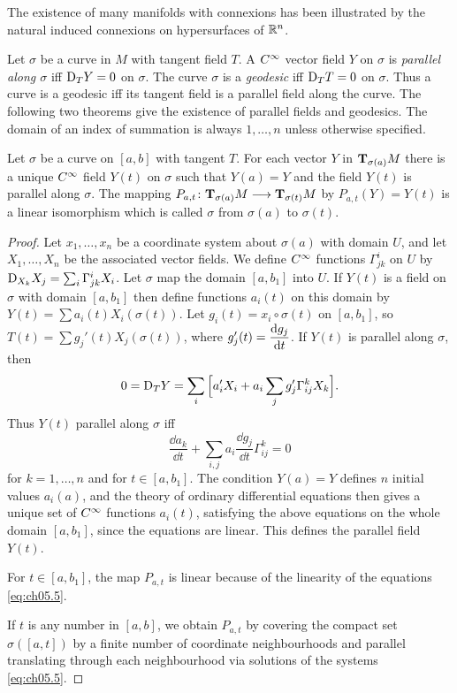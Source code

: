 \documentclass[../main]{subfiles}
\begin{document}
The existence of many manifolds with connexions has been illustrated by the natural induced connexions on hypersurfaces of $\bbR^n$.

Let $\sigma$ be a curve in $M$ with tangent field $T$. A $\CInfty$ vector field $Y$ on $\sigma$ is \emph{parallel along $\sigma$} iff $\connection_T Y = 0$ on $\sigma$. The curve $\sigma$ is a \emph{geodesic} iff $\connection_T T = 0$ on $\sigma$. Thus a curve is a geodesic iff its tangent field is a parallel field along the curve. The following two theorems give the existence of parallel fields and geodesics. The domain of an index of summation is always $1,\dots,n$ unless otherwise specified.



\begin{theorem} \label{thm:ch5.1.1} %
Let $\sigma$ be a curve on $[a,b]$ with tangent $T$. For each vector $Y$ in $\tangentspace{M}{\sigma(a)}$ there is a unique $\CInfty$ field $Y(t)$ on $\sigma$ such that $Y(a) = Y$ and the field $Y(t)$ is parallel along $\sigma$. The mapping $P_{a,t} \colon \tangentspace{M}{\sigma(a)} \longrightarrow \tangentspace{M}{\sigma(t)}$ by $P_{a,t}(Y) = Y(t)$ is a linear isomorphism which is called  $\sigma$ from $\sigma(a)$ to $\sigma(t)$.
\end{theorem}

\begin{proof}
Let $x_1,\dots,x_n$ be a coordinate system about $\sigma(a)$ with domain $U$, and let $X_1,\dots,X_n$ be the associated vector fields. We define $\CInfty$ functions $\Gamma_{jk}^i$ on $U$ by $\connection_{X_k}X_j = \sum_{i} \Gamma_{jk}^i X_i$. Let $\sigma$ map the domain $[a,b_1]$ into $U$. If $Y(t)$ is a field on $\sigma$ with domain $[a,b_1]$ then define functions $a_i(t)$ on this domain by $Y(t) = \sum a_i(t) X_i(\sigma(t))$. Let $g_i(t) = x_i \circ \sigma(t)$ on $[a,b_1]$, so $T(t) = \sum g_j'(t) X_j(\sigma(t))$, where $g_j'(t) = \dv{g_j}{t}$. If $Y(t)$ is parallel along $\sigma$, then
\[0 = \connection_T Y = \sum_i\Big[a_i'X_i + a_i \sum_j g_j'\Gamma_{ij}^k X_k\Big].\]
Thus $Y(t)$ parallel along $\sigma$ iff
\begin{equation} \label{eq:ch05.5}
\tag{5}
\frac{\dd{a_k}}{\dd{t}} + \sum_{i,j} a_i \frac{\dd{g_j}}{\dd{t}} \Gamma_{ij}^k = 0
\end{equation}
for $k=1,\dots,n$ and for $t \in [a,b_1]$. The condition $Y(a) = Y$ defines $n$ initial values $a_i(a)$, and the theory of ordinary differential equations then gives a unique set of $\CInfty$ functions $a_i(t)$, satisfying the above equations on the whole domain $[a,b_1]$, since the equations are linear. This defines the parallel field $Y(t)$.

For $t \in [a,b_1]$, the map $P_{a,t}$ is linear because of the linearity of the equations \ref{eq:ch05.5}.

If $t$ is any number in $[a,b]$, we obtain $P_{a,t}$ by covering the compact set $\sigma([a,t])$ by a finite number of coordinate neighbourhoods and parallel translating through each neighbourhood via solutions of the systems \ref{eq:ch05.5}.
\end{proof}
\end{document}
